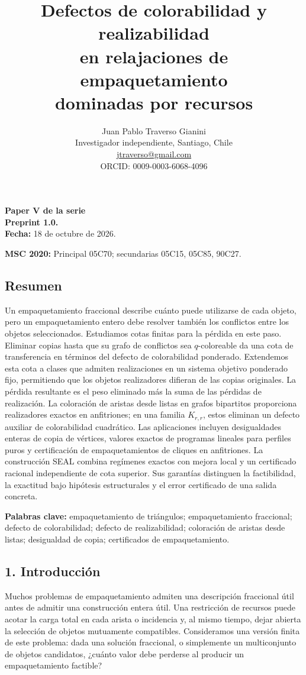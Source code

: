 \documentclass[spanish,11pt,a4paper]{article}
\title{Defectos de colorabilidad y realizabilidad\\en relajaciones de empaquetamiento\\dominadas por recursos}
\author{Juan Pablo Traverso Gianini\\
\small Investigador independiente, Santiago, Chile\\
\small \href{mailto:jtraverso@gmail.com}{jtraverso@gmail.com}\\
\small ORCID: 0009-0003-6068-4096}
\date{}
\begin{document}
\raggedbottom
\maketitle
\textbf{Paper V de la serie}\\
\textbf{Preprint 1.0.}\\
\textbf{Fecha:} 18 de octubre de 2026.

\textbf{MSC 2020:} Principal 05C70; secundarias 05C15, 05C85, 90C27.

\subsection{Resumen}\label{resumen}

Un empaquetamiento fraccional describe cuánto puede utilizarse de cada
objeto, pero un empaquetamiento entero debe resolver también los
conflictos entre los objetos seleccionados. Estudiamos cotas finitas
para la pérdida en este paso. Eliminar copias hasta que su grafo de
conflictos sea \(q\)-coloreable da una cota de transferencia en términos
del defecto de colorabilidad ponderado. Extendemos esta cota a clases
que admiten realizaciones en un sistema objetivo ponderado fijo,
permitiendo que los objetos realizadores difieran de las copias
originales. La pérdida resultante es el peso eliminado más la suma de
las pérdidas de realización. La coloración de aristas desde listas en
grafos bipartitos proporciona realizadores exactos en anfitriones; en
una familia \(K_{r,r}\), estos eliminan un defecto auxiliar de
colorabilidad cuadrático. Las aplicaciones incluyen desigualdades
enteras de copia de vértices, valores exactos de programas lineales para
perfiles puros y certificación de empaquetamientos de cliques en
anfitriones. La construcción SEAL combina regímenes exactos con mejora
local y un certificado racional independiente de cota superior. Sus
garantías distinguen la factibilidad, la exactitud bajo hipótesis
estructurales y el error certificado de una salida concreta.

\textbf{Palabras clave:} empaquetamiento de triángulos; empaquetamiento
fraccional; defecto de colorabilidad; defecto de realizabilidad;
coloración de aristas desde listas; desigualdad de copia; certificados
de empaquetamiento.

\subsection{1. Introducción}\label{introducciuxf3n}

Muchos problemas de empaquetamiento admiten una descripción fraccional
útil antes de admitir una construcción entera útil. Una restricción de
recursos puede acotar la carga total en cada arista o incidencia y, al
mismo tiempo, dejar abierta la selección de objetos mutuamente
compatibles. Consideramos una versión finita de este problema: dada una
solución fraccional, o simplemente un multiconjunto de objetos
candidatos, ¿cuánto valor debe perderse al producir un empaquetamiento
factible?
\end{document}
